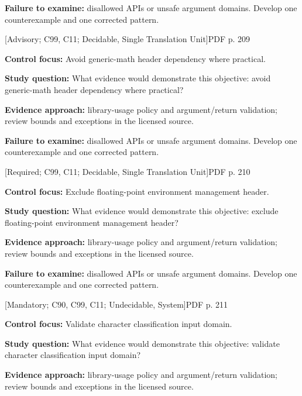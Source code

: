 \documentclass[10pt,letterpaper]{article}
\begin{document}
\textbf{Failure to examine:} disallowed APIs or unsafe argument domains. Develop one counterexample and one corrected pattern.\par
\smallskip
{}
 \textsf{\footnotesize [Advisory; C99, C11; Decidable, Single Translation Unit]}\hfill{\footnotesize PDF p. 209}\par
\textbf{Control focus:} Avoid generic-math header dependency where practical.\par
\textbf{Study question:} What evidence would demonstrate this objective: avoid generic-math header dependency where practical?\par
\textbf{Evidence approach:} library-usage policy and argument/return validation; review bounds and exceptions in the licensed source.\par
\textbf{Failure to examine:} disallowed APIs or unsafe argument domains. Develop one counterexample and one corrected pattern.\par
\smallskip
{}
 \textsf{\footnotesize [Required; C99, C11; Decidable, Single Translation Unit]}\hfill{\footnotesize PDF p. 210}\par
\textbf{Control focus:} Exclude floating-point environment management header.\par
\textbf{Study question:} What evidence would demonstrate this objective: exclude floating-point environment management header?\par
\textbf{Evidence approach:} library-usage policy and argument/return validation; review bounds and exceptions in the licensed source.\par
\textbf{Failure to examine:} disallowed APIs or unsafe argument domains. Develop one counterexample and one corrected pattern.\par
\smallskip
{}
 \textsf{\footnotesize [Mandatory; C90, C99, C11; Undecidable, System]}\hfill{\footnotesize PDF p. 211}\par
\textbf{Control focus:} Validate character classification input domain.\par
\textbf{Study question:} What evidence would demonstrate this objective: validate character classification input domain?\par
\textbf{Evidence approach:} library-usage policy and argument/return validation; review bounds and exceptions in the licensed source.\par
\end{document}
